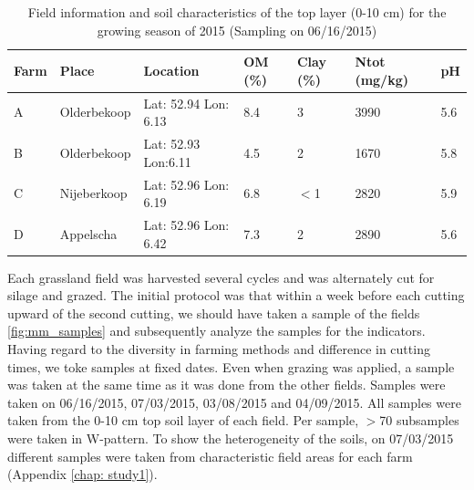 \documentclass[10pt,twoside,dutch,english]{report}
\begin{document}
\begin{table}[ht] %
	\caption{Field information and soil characteristics of the top layer (0-10 cm) for the growing season of 2015 (Sampling on 06/16/2015) }
	\footnotesize 
	\renewcommand{\arraystretch}{1.2}
	
	
	\begin{tabu} to %
		\toprule	\rowfont{\bfseries}
		Farm & Place & Location & OM (\%) & Clay (\%) & Ntot (mg/kg) & pH \\  \midrule
		A & Olderbekoop & Lat: 52.94 Lon: 6.13 & 8.4 & 3 & 3990& 5.6 \\
		B & Olderbekoop& Lat: 52.93 Lon:6.11 & 4.5& 2& 1670& 5.8\\
		C & Nijeberkoop & Lat: 52.96 Lon: 6.19 & 6.8& $<$1& 2820& 5.9\\
		D & Appelscha & Lat: 52.96 Lon: 6.42 & 7.3& 2& 2890& 5.6\\		 \bottomrule
	\end{tabu}
	
\end{table}

Each grassland field was harvested several cycles and was alternately cut for silage and grazed. The initial protocol was that within a week before each cutting upward of the second cutting, we should have taken a sample of the fields \ref{fig:mm_samples} and subsequently analyze the samples for the indicators. Having regard to the diversity in farming methods and difference in cutting times, we toke samples at fixed dates.  Even when grazing was applied, a sample was taken at the same time as it was done from the other fields. Samples were taken on 06/16/2015, 07/03/2015, 03/08/2015 and 04/09/2015. All samples were taken from the 0-10 cm top soil layer of each field. Per sample, $>$70 subsamples were taken in W-pattern. To show the heterogeneity of the soils, on 07/03/2015 different samples were taken from characteristic field areas for each farm (Appendix \ref{chap: study1}).
\end{document}
